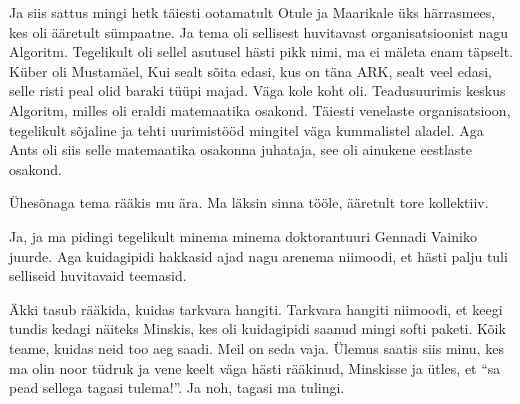 Ja siis sattus mingi hetk täiesti ootamatult Otule ja Maarikale üks härrasmees, kes oli ääretult sümpaatne. Ja tema oli sellisest huvitavast organisatsioonist nagu Algoritm.  Tegelikult  oli sellel asutusel hästi pikk nimi, ma ei mäleta enam täpselt. Küber oli Mustamäel, Kui sealt sõita edasi, kus on täna ARK, sealt veel edasi, selle risti peal olid baraki tüüpi majad. Väga  kole koht oli. Teadusuurimis keskus Algoritm, milles oli eraldi matemaatika osakond. Täiesti venelaste organisatsioon, tegelikult sõjaline ja tehti uurimistööd mingitel väga kummalistel aladel. Aga Ants oli siis selle matemaatika osakonna juhataja, see oli ainukene eestlaste osakond. 

Ühesõnaga tema rääkis mu ära. Ma läksin sinna tööle,  ääretult tore kollektiiv. 


Ja, ja ma pidingi tegelikult minema minema doktorantuuri Gennadi Vainiko juurde. Aga kuidagipidi  hakkasid ajad nagu arenema niimoodi, et hästi palju tuli selliseid huvitavaid teemasid. 

Äkki tasub  rääkida, kuidas tarkvara hangiti. Tarkvara hangiti niimoodi, et keegi tundis kedagi näiteks Minskis, kes oli kuidagipidi saanud mingi softi paketi. Kõik teame, kuidas neid too aeg saadi. Meil on seda vaja. Ülemus saatis siis minu, kes ma olin  noor tüdruk ja vene keelt väga hästi rääkinud, Minskisse ja ütles, et \enquote{sa pead sellega tagasi tulema!}. Ja noh, tagasi ma tulingi. 

